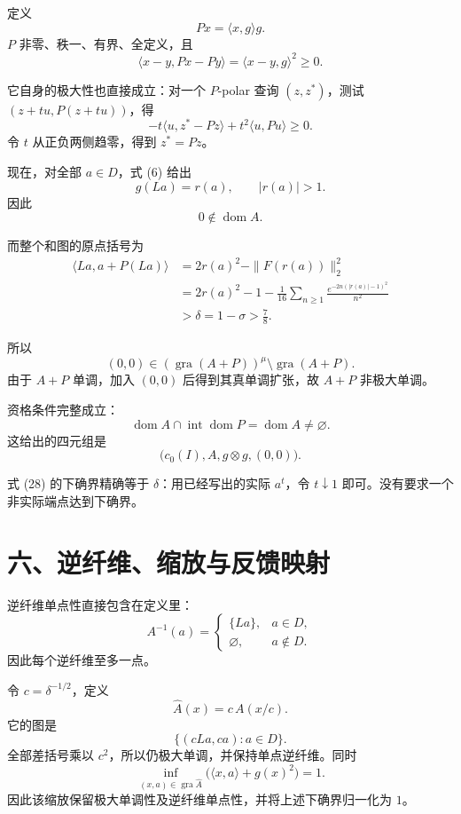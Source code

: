 \documentclass[UTF8,fontset=fandol,11pt,a4paper]{ctexart}
\begin{document}
定义 \[
\boxed{Px=\langle x,g\rangle g.}
\tag{26}
\] $P$ 非零、秩一、有界、全定义，且 \[
\langle x-y,Px-Py\rangle
=\langle x-y,g\rangle^2\ge0.
\]

它自身的极大性也直接成立：对一个 $P$-polar 查询 $(z,z^*)$，测试 $(z+tu,P(z+tu))$，得 \[
-t\langle u,z^*-Pz\rangle
+t^2\langle u,Pu\rangle\ge0.
\] 令 $t$ 从正负两侧趋零，得到 $z^*=Pz$。

现在，对全部 $a\in D$，式 (6) 给出 \[
g(La)=r(a),\qquad |r(a)|>1.
\] 因此 \[
\boxed{0\notin\operatorname{dom}A.}
\tag{27}
\]

而整个和图的原点括号为 \[
\begin{aligned}
\langle La,a+P(La)\rangle
&=2r(a)^2-\|F(r(a))\|_2^2\\
&=2r(a)^2-1
-\frac1{16}\sum_{n\ge1}
\frac{e^{-2n(|r(a)|-1)^2}}{n^2}\\
&>\delta=1-\sigma>\frac78.
\end{aligned}
\tag{28}
\]

所以 \[
\boxed{
(0,0)\in
(\operatorname{gra}(A+P))^\mu
\setminus\operatorname{gra}(A+P).
}
\tag{29}
\]
由于 $A+P$ 单调，加入 $(0,0)$ 后得到其真单调扩张，故 $A+P$ 非极大单调。

资格条件完整成立： \[
\boxed{
\operatorname{dom}A
\cap\operatorname{int}\operatorname{dom}P
=
\operatorname{dom}A\ne\varnothing.
}
\tag{30}
\] 这给出的四元组是 \[
\boxed{\bigl(c_0(I),A,g\otimes g,(0,0)\bigr).}
\]

式 (28) 的下确界精确等于 $\delta$：用已经写出的实际 $a^t$，令 $t\downarrow1$ 即可。没有要求一个非实际端点达到下确界。

\section{六、逆纤维、缩放与反馈映射}\label{ux516dux4e0eux5f53ux524d-sinf-ux548cux53cdux9988ux95eeux9898ux7684ux7cbeux786eux8fdeux63a5}

逆纤维单点性直接包含在定义里： \[
A^{-1}(a)=
\begin{cases}
\{La\},&a\in D,\\
\varnothing,&a\notin D.
\end{cases}
\] 因此每个逆纤维至多一点。

令 $c=\delta^{-1/2}$，定义 \[
\widehat A(x)=c\,A(x/c).
\] 它的图是 \[
\{(cLa,ca):a\in D\}.
\] 全部差括号乘以 $c^2$，所以仍极大单调，并保持单点逆纤维。同时 \[
\boxed{
\inf_{(x,a)\in\operatorname{gra}\widehat A}
\bigl(\langle x,a\rangle+g(x)^2\bigr)=1.
}
\tag{31}
\] 因此该缩放保留极大单调性及逆纤维单点性，并将上述下确界归一化为 $1$。
\end{document}
